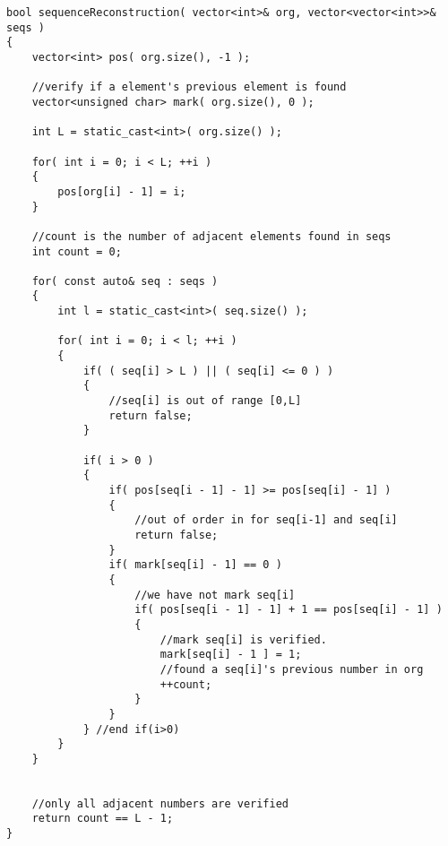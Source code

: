 \setcounter{lstlisting}{0}
\begin{lstlisting}[style=customc, caption={Verify The Position}]
bool sequenceReconstruction( vector<int>& org, vector<vector<int>>& seqs )
{
    vector<int> pos( org.size(), -1 );

    //verify if a element's previous element is found
    vector<unsigned char> mark( org.size(), 0 );

    int L = static_cast<int>( org.size() );

    for( int i = 0; i < L; ++i )
    {
        pos[org[i] - 1] = i;
    }

    //count is the number of adjacent elements found in seqs
    int count = 0;

    for( const auto& seq : seqs )
    {
        int l = static_cast<int>( seq.size() );

        for( int i = 0; i < l; ++i )
        {
            if( ( seq[i] > L ) || ( seq[i] <= 0 ) )
            {
                //seq[i] is out of range [0,L]
                return false;
            }

            if( i > 0 )
            {
                if( pos[seq[i - 1] - 1] >= pos[seq[i] - 1] )
                {
                    //out of order in for seq[i-1] and seq[i]
                    return false;
                }
                if( mark[seq[i] - 1] == 0 )
                {
                    //we have not mark seq[i]
                    if( pos[seq[i - 1] - 1] + 1 == pos[seq[i] - 1] )
                    {
                        //mark seq[i] is verified.
                        mark[seq[i] - 1 ] = 1;
                        //found a seq[i]'s previous number in org
                        ++count;
                    }
                }
            } //end if(i>0)
        }
    }


    //only all adjacent numbers are verified
    return count == L - 1;
}
\end{lstlisting}
